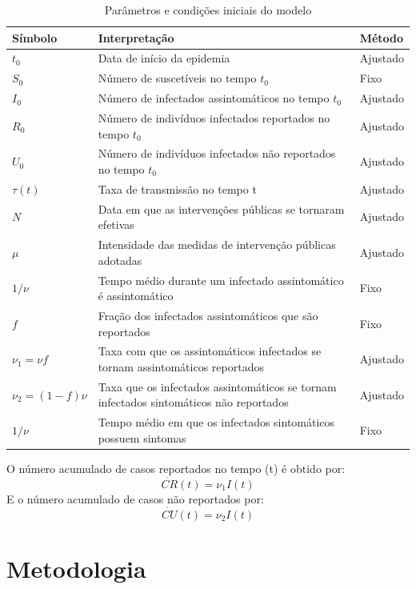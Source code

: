 \documentclass[12pt]{article}
\begin{document}
\begin{table}[h]
\centering
\begin{small}
\caption{Parâmetros e condições iniciais do modelo} \label{Tabela1}
\begin{tabular}{|p{2.5cm}|p{10.5cm}|p{2cm}|}
\hline
Símbolo & Interpretação & Método\\
\hline
$t_0$ & Data de início da epidemia & Ajustado \\
\hline
$S_0$ & Número de suscetíveis no tempo $t_0$ & Fixo\\
\hline
$I_0$ & Número de infectados assintomáticos no tempo $t_0$ & Ajustado\\
\hline
$R_0$ & Número de indivíduos infectados reportados no tempo $t_0$ & Ajustado \\
\hline
$U_0$ & Número de indivíduos infectados não reportados no tempo $t_0$ & Ajustado \\
\hline
$\tau(t)$ & Taxa de transmissão no tempo t & Ajustado \\
\hline
$N$ & Data em que as intervenções públicas se tornaram efetivas & Ajustado \\
\hline
$\mu$ & Intensidade das medidas de intervenção públicas adotadas & Ajustado \\
\hline
$1/\nu$ & Tempo médio durante um infectado assintomático é assintomático & Fixo \\
\hline
$f$ & Fração dos infectados assintomáticos que são reportados & Fixo \\
\hline
$\nu_1  = \nu f$ & Taxa com que os assintomáticos infectados se tornam assintomáticos reportados & Ajustado \\
\hline
$\nu_2 = (1-f)\nu$ & Taxa que os infectados assintomáticos se tornam infectados sintomáticos não reportados & Ajustado \\
\hline
$1 / \nu$ & Tempo médio em que os infectados sintomáticos possuem sintomas & Fixo\\
\hline
\end{tabular}
\end{small}
\end{table}

\noindent O número acumulado de casos reportados no tempo (t) é obtido por:
$$\dot{CR}(t) = \nu_1I(t)$$
E o número acumulado de casos não reportados por:
$$\dot{CU}(t) = \nu_2 I(t)$$

 
\section{Metodologia}
\end{document}
